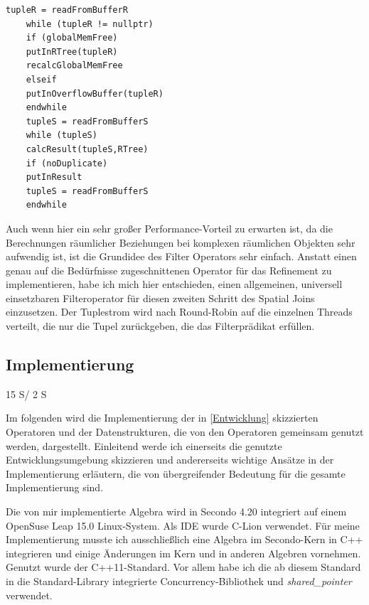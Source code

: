 \documentclass[a4paper,12pt,twoside]{article}
\newcommand{\Fb}[1]{\textit{#1}} %
\begin{document}
\begin{minipage}{\linewidth}
	\begin{lstlisting}[caption={Spatial Join: Worker}, label=list:spatialJoin]
	tupleR = readFromBufferR 
	while (tupleR != nullptr)
	if (globalMemFree)
	putInRTree(tupleR)
	recalcGlobalMemFree
	elseif
	putInOverflowBuffer(tupleR)
	endwhile
	tupleS = readFromBufferS
	while (tupleS)
	calcResult(tupleS,RTree)
	if (noDuplicate)
	putInResult
	tupleS = readFromBufferS
	endwhile
	\end{lstlisting}
\end{minipage}

Auch wenn hier ein sehr großer Performance-Vorteil zu erwarten ist, da die Berechnungen räumlicher Beziehungen bei komplexen räumlichen Objekten sehr aufwendig ist, ist die Grundidee des Filter Operators sehr einfach. Anstatt einen genau auf die Bedürfnisse zugeschnittenen Operator für das Refinement zu implementieren, habe ich mich hier entschieden, einen allgemeinen, universell einsetzbaren Filteroperator für diesen zweiten Schritt des Spatial Joins einzusetzen. Der Tuplestrom wird nach Round-Robin auf die einzelnen Threads verteilt, die nur die Tupel zurückgeben, die das Filterprädikat erfüllen.

\subsection{Implementierung} 15 S/ 2 S
\label{Implemeniterung} 

Im folgenden wird die Implementierung der in \autoref{Entwicklung} skizzierten Operatoren und der Datenstrukturen, die von den Operatoren gemeinsam genutzt werden, dargestellt. Einleitend werde ich einerseits die genutzte Entwicklungsumgebung skizzieren und andererseits wichtige Ansätze in der Implementierung erläutern, die von übergreifender Bedeutung für die gesamte Implementierung sind.

Die von mir implementierte Algebra wird in Secondo 4.20 integriert auf einem OpenSuse Leap 15.0 Linux-System. Als IDE wurde C-Lion verwendet. Für meine Implementierung musste ich ausschließlich eine Algebra im Secondo-Kern in C++ integrieren und einige Änderungen im Kern und in anderen Algebren vornehmen. Genutzt wurde der C++11-Standard. Vor allem habe ich die ab diesem Standard in die Standard-Library integrierte Concurrency-Bibliothek und \Fb{shared\_pointer} verwendet.
\end{document}
